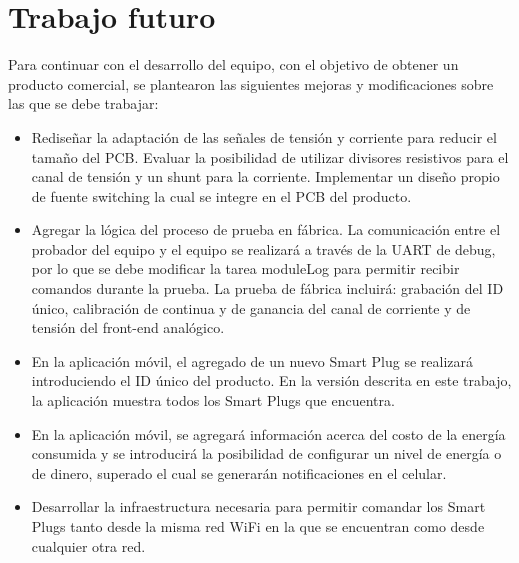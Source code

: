 \section{Trabajo futuro}
\label{sec:trabajo_futuro}

Para continuar con el desarrollo del equipo, con el objetivo de obtener un producto comercial, se plantearon las siguientes mejoras y modificaciones sobre las que se debe trabajar:

\begin{itemize}
\item Rediseñar la adaptación de las señales de tensión y corriente para reducir el tamaño del PCB. Evaluar la posibilidad de utilizar divisores resistivos para el canal de tensión y un shunt para la corriente. Implementar un diseño propio de fuente switching la cual se integre en el PCB del producto.
\item Agregar la lógica del proceso de prueba en fábrica. La comunicación entre el probador del equipo y el equipo se realizará a través de la UART de debug, por lo que se debe modificar la tarea moduleLog para permitir recibir comandos durante la prueba. La prueba de fábrica incluirá: grabación del ID único, calibración de continua y de ganancia del canal de corriente y de tensión del front-end analógico.
\item En la aplicación móvil, el agregado de un nuevo Smart Plug se realizará introduciendo el ID único del producto. En la versión descrita en este trabajo, la aplicación muestra todos los Smart Plugs que encuentra.
\item En la aplicación móvil, se agregará información acerca del costo de la energía consumida y se introducirá la posibilidad de configurar un nivel de energía o de dinero, superado el cual se generarán notificaciones en el celular.
\item Desarrollar la infraestructura necesaria para permitir comandar los Smart Plugs tanto desde la misma red WiFi en la que se encuentran como desde cualquier otra red.
\end{itemize}

